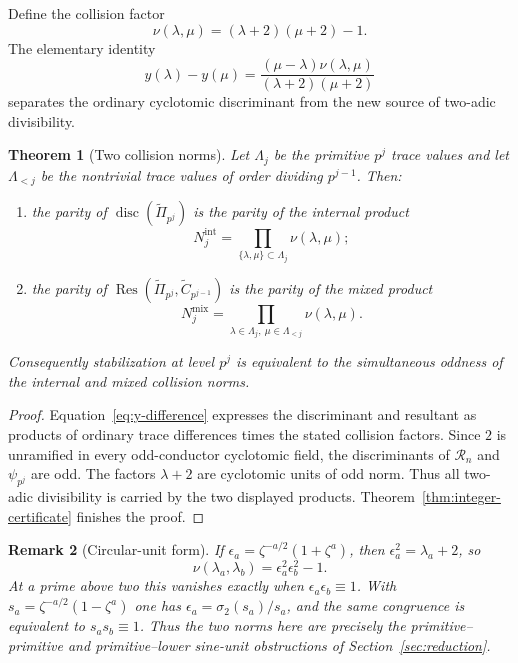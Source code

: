 \documentclass[a4paper]{article}
\newtheorem{theorem}{Theorem}[section]
\newtheorem{remark}[theorem]{Remark}
\DeclareMathOperator{\Res}{Res}
\begin{document}
Define the collision factor
\[
	\nu(\lambda,\mu)=(\lambda+2)(\mu+2)-1.
\]
The elementary identity
\begin{equation}\label{eq:y-difference}
	y(\lambda)-y(\mu)
	=\frac{(\mu-\lambda)\nu(\lambda,\mu)}
	       {(\lambda+2)(\mu+2)}
\end{equation}
separates the ordinary cyclotomic discriminant from the new source of
two-adic divisibility.

\begin{theorem}[Two collision norms]\label{thm:two-collision-norms}
	Let $\Lambda_j$ be the primitive $p^j$ trace values and let
	$\Lambda_{<j}$ be the nontrivial trace values of order dividing
	$p^{j-1}$.  Then:
	\begin{enumerate}
		\item the parity of
		      $\operatorname{disc}(\widetilde\Pi_{p^j})$ is the parity of
		      the internal product
		      \[
			      N_j^{\mathrm{int}}
			      =\prod_{\{\lambda,\mu\}\subset\Lambda_j}
			       \nu(\lambda,\mu);
		      \]
		\item the parity of
		      $\Res(\widetilde\Pi_{p^j},\widetilde C_{p^{j-1}})$ is the
		      parity of the mixed product
		      \[
			      N_j^{\mathrm{mix}}
			      =\prod_{\lambda\in\Lambda_j,\ \mu\in\Lambda_{<j}}
			       \nu(\lambda,\mu).
		      \]
	\end{enumerate}
	Consequently stabilization at level $p^j$ is equivalent to the
	simultaneous oddness of the internal and mixed collision norms.
\end{theorem}

\begin{proof}
	Equation~\eqref{eq:y-difference} expresses the discriminant and
	resultant as products of ordinary trace differences times the stated
	collision factors.  Since $2$ is unramified in every odd-conductor
	cyclotomic field, the discriminants of
	$\mathcal R_n$ and $\psi_{p^j}$ are odd.  The factors
	$\lambda+2$ are cyclotomic units of odd norm.  Thus all two-adic
	divisibility is carried by the two displayed products.
	Theorem~\ref{thm:integer-certificate} finishes the proof.
\end{proof}

\begin{remark}[Circular-unit form]
	If
	$\epsilon_a=\zeta^{-a/2}(1+\zeta^a)$, then
	$\epsilon_a^2=\lambda_a+2$, so
	\[
		\nu(\lambda_a,\lambda_b)
		=\epsilon_a^2\epsilon_b^2-1.
	\]
	At a prime above two this vanishes exactly when
	$\epsilon_a\epsilon_b\equiv1$.  With
	$s_a=\zeta^{-a/2}(1-\zeta^a)$ one has
	$\epsilon_a=\sigma_2(s_a)/s_a$, and the same congruence is equivalent
	to $s_as_b\equiv1$.  Thus the two norms here are precisely the
	primitive--primitive and primitive--lower sine-unit obstructions of
	Section~\ref{sec:reduction}.
\end{remark}
\end{document}
